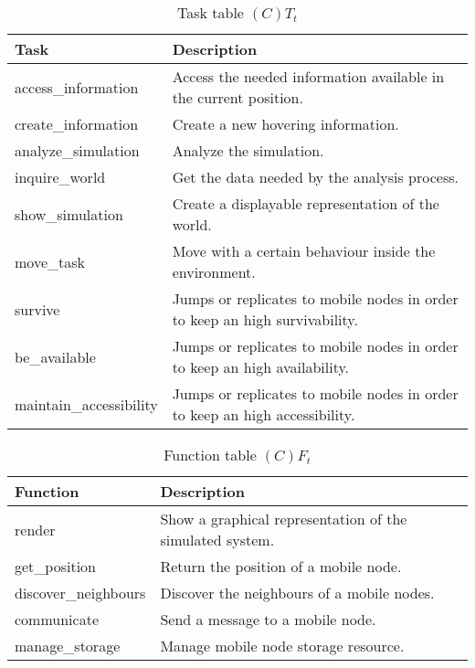 \begin{table}[H]
	\centering
	\begin{tabular}{|p{5cm}|p{7cm}|}
			\hline
			\textbf{Task} & \textbf{Description} \\
			\hline
			access\_information & Access the needed information available in the
			current position.\\
			\hline
			create\_information & Create a new hovering information. \\
			\hline
			analyze\_simulation & Analyze the simulation.\\
			\hline
			inquire\_world & Get the data needed by the analysis process.  \\
			\hline
			show\_simulation & Create a displayable representation of the world. \\
			\hline
			move\_task & Move with a certain behaviour inside the environment. \\
			\hline
			survive & Jumps or replicates to mobile nodes in order to keep an high
			survivability. \\
			\hline
			be\_available & Jumps or replicates to mobile nodes in order to keep an
			high availability. \\
			\hline
			maintain\_accessibility & Jumps or replicates to mobile nodes in order to
			keep an high accessibility. \\
			\hline
		\end{tabular}
	\caption{Task table $(C)T_t$}
	\label{tab:ctt}
\end{table}

\begin{table}[H]
	\centering
	\begin{tabular}{|p{5cm}|p{7cm}|}
			\hline
			\textbf{Function} & \textbf{Description} \\
			\hline
			render & Show a graphical representation of the simulated system. \\
			\hline
			get\_position & Return the position of a mobile node. \\
			\hline
			discover\_neighbours & Discover the neighbours of a mobile nodes. \\
			\hline
			communicate & Send a message to a mobile node. \\
			\hline
			manage\_storage & Manage mobile node storage resource. \\
			\hline
		\end{tabular}
	\caption{Function table $(C)F_t$}
	\label{tab:cft}
\end{table}

